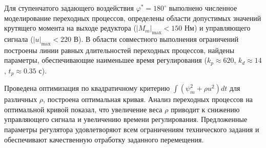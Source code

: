 \documentclass[a4paper, 14pt]{extarticle}
\begin{document}
        Для ступенчатого задающего воздействия $\varphi^* = 180^\circ$ выполнено численное моделирование переходных процессов, определены области допустимых значений крутящего момента на выходе редуктора ($|M_m|_{\max}<150$ Нм) и управляющего сигнала ($|u|_{\max}<220$ В). В области совместного выполнения ограничений построены линии равных длительностей переходных процессов, найдены параметры, обеспечивающие наименьшее время регулирования ($k_p\approx 620$, $k_d\approx 14$, $t_p\approx 0.35$ с).

        Проведена оптимизация по квадратичному критерию $\int(\psi_m^2+\rho u^2)dt$ для различных $\rho$, построена оптимальная кривая. Анализ переходных процессов на оптимальной кривой показал, что увеличение веса $\rho$ приводит к снижению управляющего сигнала и увеличению времени регулирования. Предложенные параметры регулятора удовлетворяют всем ограничениям технического задания и обеспечивают качественную отработку заданного перемещения.
\end{document}
